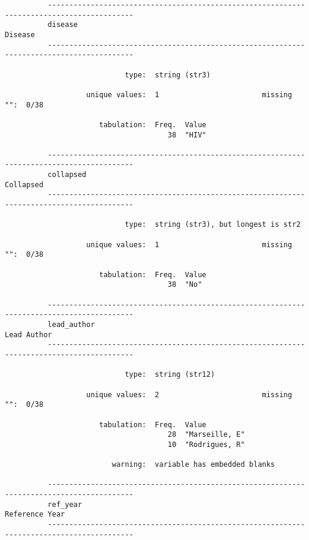 \documentclass{article}
\begin{document}
\begin{verbatim}
          
          
          
          ------------------------------------------------------------------------------------------
          disease                                                                            Disease
          ------------------------------------------------------------------------------------------
          
                            type:  string (str3)
          
                   unique values:  1                        missing "":  0/38
          
                      tabulation:  Freq.  Value
                                      38  "HIV"
          
          ------------------------------------------------------------------------------------------
          collapsed                                                                        Collapsed
          ------------------------------------------------------------------------------------------
          
                            type:  string (str3), but longest is str2
          
                   unique values:  1                        missing "":  0/38
          
                      tabulation:  Freq.  Value
                                      38  "No"
          
          ------------------------------------------------------------------------------------------
          lead_author                                                                    Lead Author
          ------------------------------------------------------------------------------------------
          
                            type:  string (str12)
          
                   unique values:  2                        missing "":  0/38
          
                      tabulation:  Freq.  Value
                                      28  "Marseille, E"
                                      10  "Rodrigues, R"
          
                         warning:  variable has embedded blanks
          
          ------------------------------------------------------------------------------------------
          ref_year                                                                    Reference Year
          ------------------------------------------------------------------------------------------
          

\end{verbatim}
\end{document}
